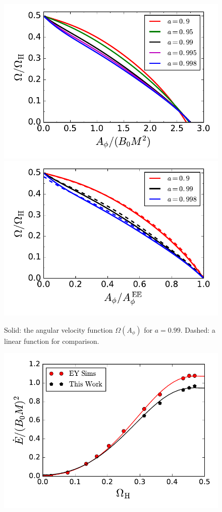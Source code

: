 \documentclass[aps,prd,reprint,nofootinbib, superscriptaddress]{revtex4-1}
\def\Ap{A_\phi}
\begin{document}
\begin{figure}
\includegraphics[scale=0.6]{f2a}
\includegraphics[scale=0.6]{f2b}
\caption{\label{fig:omega} Solid: the angular velocity function $\Omega(\Ap)$ for $a=0.99$.
Dashed: a linear function for comparison.}
\end{figure}


\begin{figure}
\includegraphics[scale=0.6]{f3}
\caption{\label{fig:Edot}}
\end{figure}
\end{document}
